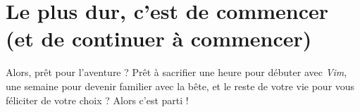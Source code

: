 \section{Le plus dur, c'est de commencer (et de continuer à commencer)}

Alors, prêt pour l'aventure ? Prêt à sacrifier une heure pour débuter avec \emph{Vim}, une semaine pour devenir familier avec la bête, et le reste de votre vie pour vous féliciter de votre choix ? Alors c'est parti !


